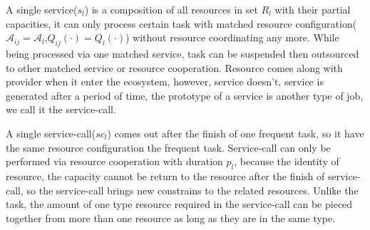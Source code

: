 A single service($s_l$) is a composition of all resources in set $R_l$ with their partial capacities, it can only process certain task with matched resource configuration($\mathcal{A}_{ij}=\mathcal{A}_l$,$ Q_{ij}(\cdot)=Q_l(\cdot)$) without resource coordinating any more. While being processed via one matched service, task can be suspended then outsourced to other matched service or resource cooperation.
Resource comes along with provider when it enter the ecosystem, however, service doesn't, service is generated after a period of time, the prototype of a service is another type of job, we call it the service-call.

A single service-call($sc_l$) comes out after the finish of one frequent task, so it have the same resource configuration the frequent task. Service-call can only be performed via resource cooperation with duration $p_l$, because the identity of resource, the capacity cannot be return to the resource after the finish of service-call, so the service-call brings new constrains to the related resources. Unlike the task, the amount of one type resource required in the service-call can be pieced together from more than one resource as long as they are in the same type.



